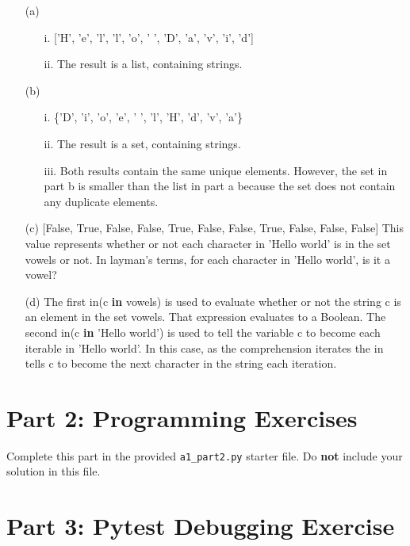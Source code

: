 \documentclass[fontsize=11pt]{article}
\begin{document}
\begin{enumerate}
        \begin{enumerate}
            \item[(a)]
            \begin{enumerate}
                \item[i.] ['H', 'e', 'l', 'l', 'o', ' ', 'D', 'a', 'v', 'i', 'd']
                \item[ii.] The result is a list, containing strings.
            \end{enumerate}
            \item[(b)]
            \begin{enumerate}
                \item[i.] \{'D', 'i', 'o', 'e', ' ', 'l', 'H', 'd', 'v', 'a'\}
                \item[ii.] The result is a set, containing strings.
                \item[iii.] Both results contain the same unique elements. However, the set in part b is smaller than the list in part a because the set does not contain any duplicate elements.
            \end{enumerate}
            \item[(c)]
            [False, True, False, False, True, False, False, True, False, False, False] This value represents whether or not each character in 'Hello world' is in the set vowels or not. In layman's terms, for each character in 'Hello world', is it a vowel?
            \item[(d)]
            The first in(c \textbf{in} vowels) is used to evaluate whether or not the string c is an element in the set vowels. That expression evaluates to a Boolean. The second in(c \textbf{in} 'Hello world') is used to tell the variable c to become each iterable in 'Hello world'. In this case, as the comprehension iterates the in tells c to become the next character in the string each iteration.
        \end{enumerate}
    \end{enumerate}

    \section*{Part 2: Programming Exercises}

    Complete this part in the provided \texttt{a1\_part2.py} starter file.
    Do \textbf{not} include your solution in this file.

    \section*{Part 3: Pytest Debugging Exercise}
\end{document}
